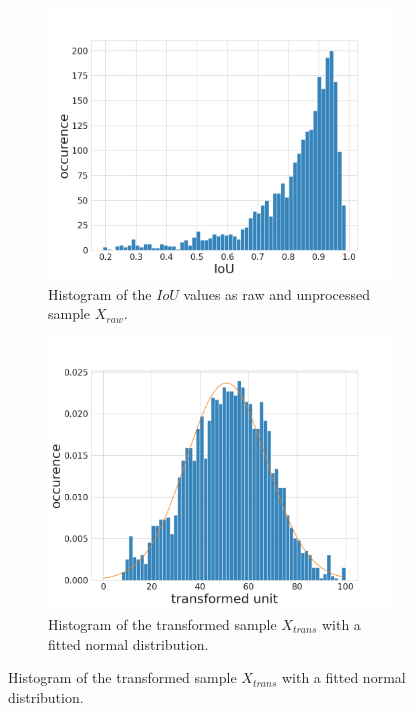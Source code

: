 \begin{figure} [h]
	\centering
	\begin{subfigure}[t]{0.3\textwidth}
		\centering
		\includegraphics[width=\textwidth]{figures/chap51_iou_raw.png}
		\caption{
			Histogram of the $ IoU $ values as raw and unprocessed sample $ X_{raw} $.
		}\label{fig:ch5:sec1:data_raw}
	\end{subfigure}
	\hfill
	\begin{subfigure}[t]{0.3\textwidth}
		\centering
		\includegraphics[width=\textwidth]{figures/chap51_iou_trans.png}
		\caption{
			Histogram of the transformed sample $ X_{trans} $ with a fitted normal distribution.
}
\end{subfigure}
\end{figure}
